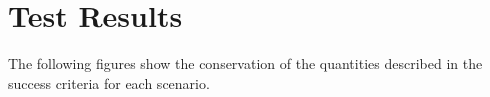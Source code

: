 \section{Test Results}

The following figures show the conservation of the quantities described in the success criteria for each scenario. 

